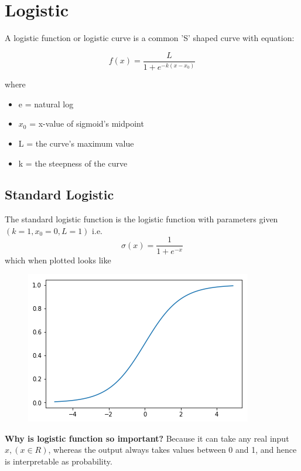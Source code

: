 \documentclass[10pt,a4paper]{article}
\begin{document}
	\section{Logistic}	
	A logistic function or logistic curve is a common 'S' shaped curve with equation:
	
	\begin{equation}
			f(x) = \frac{L}{1 + e^{-k(x-x_0)}}
	\end{equation}

	
	where
	\begin{itemize}
		\item e = natural log
		\item $x_0$ = x-value of sigmoid's midpoint
		\item L = the curve's maximum value
		\item k = the steepness of the curve
	\end{itemize}

	\subsection{Standard Logistic}
	
	The standard logistic function is the logistic function with parameters given $(k = 1, x_0 = 0, L = 1)$
	i.e.\\
	\begin{equation}
		\sigma(x) = \frac{1}{1 + e^{-x}}
	\end{equation}
	which when plotted looks like\\
	\begin{figure}[h]
		\includegraphics[scale=0.65]{sigmoidplot}
		\centering
	\end{figure}

	\textbf{Why is logistic function so important?}
	Because it can take any real input $x, (x \in R)$, whereas the output always takes values between 0 and 1, and hence is interpretable as probability.
	

	
\end{document}
